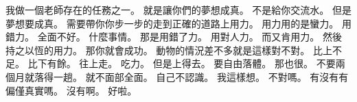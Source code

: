 \hypertarget{c01:cue:379}{}我做一個老師存在的任務之一。
\hypertarget{c01:cue:380}{}就是讓你們的夢想成真。
\hypertarget{c01:cue:381}{}不是給你交流水。
\hypertarget{c01:cue:382}{}但是夢想要成真。
\hypertarget{c01:cue:383}{}需要帶你你步一步的走到正確的道路上用力。
\hypertarget{c01:cue:384}{}用力用的是蠻力。
\hypertarget{c01:cue:385}{}用錯力。
\hypertarget{c01:cue:386}{}全面不好。
\hypertarget{c01:cue:387}{}什麼事情。
\hypertarget{c01:cue:388}{}那是用錯了力。
\hypertarget{c01:cue:389}{}用對人力。
\hypertarget{c01:cue:390}{}而又肯用力。
\hypertarget{c01:cue:391}{}然後持之以恆的用力。
\hypertarget{c01:cue:392}{}那你就會成功。
\hypertarget{c01:cue:393}{}動物的情況差不多就是這樣對不對。
\hypertarget{c01:cue:394}{}比上不足。
\hypertarget{c01:cue:395}{}比下有餘。
\hypertarget{c01:cue:396}{}往上走。
\hypertarget{c01:cue:397}{}吃力。
\hypertarget{c01:cue:398}{}但是上得去。
\hypertarget{c01:cue:399}{}要自由落體。
\hypertarget{c01:cue:400}{}那也很。
\hypertarget{c01:cue:401}{}不要兩個月就落得一趟。
\hypertarget{c01:cue:402}{}就不面部全面。
\hypertarget{c01:cue:403}{}自己不認識。
\hypertarget{c01:cue:404}{}我這樣想。
\hypertarget{c01:cue:405}{}不對嗎。
\hypertarget{c01:cue:406}{}有沒有有偏僅真實嗎。
\hypertarget{c01:cue:407}{}沒有啊。
\hypertarget{c01:cue:408}{}好啦。

